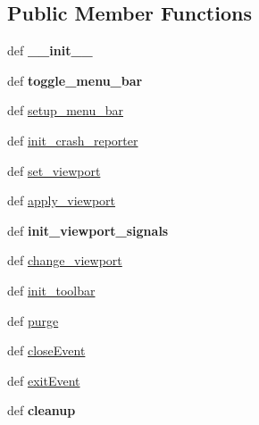 \subsection*{Public Member Functions}
\begin{DoxyCompactItemize}
\item 
\hypertarget{classcommotion__client_1_1GUI_1_1main__window_1_1MainWindow_a74b56753628f84bf3e19c128ef1fda19}{def {\bfseries \+\_\+\+\_\+init\+\_\+\+\_\+}}\label{classcommotion__client_1_1GUI_1_1main__window_1_1MainWindow_a74b56753628f84bf3e19c128ef1fda19}

\item 
\hypertarget{classcommotion__client_1_1GUI_1_1main__window_1_1MainWindow_a39b23e6f4f95af7d703ec03be942a7df}{def {\bfseries toggle\+\_\+menu\+\_\+bar}}\label{classcommotion__client_1_1GUI_1_1main__window_1_1MainWindow_a39b23e6f4f95af7d703ec03be942a7df}

\item 
def \hyperlink{classcommotion__client_1_1GUI_1_1main__window_1_1MainWindow_abacf45b62be7d880089c913e3f2f7f24}{setup\+\_\+menu\+\_\+bar}
\item 
def \hyperlink{classcommotion__client_1_1GUI_1_1main__window_1_1MainWindow_a2c803d1583ec7b548f5b2a9cb2014e4d}{init\+\_\+crash\+\_\+reporter}
\item 
def \hyperlink{classcommotion__client_1_1GUI_1_1main__window_1_1MainWindow_ad4d493c20e1d9898eeb41da87622ea49}{set\+\_\+viewport}
\item 
def \hyperlink{classcommotion__client_1_1GUI_1_1main__window_1_1MainWindow_a2972ac997218f50db2c18762ac48f23c}{apply\+\_\+viewport}
\item 
\hypertarget{classcommotion__client_1_1GUI_1_1main__window_1_1MainWindow_abf5e8a0add7f4fa1480c825a74e0e9b9}{def {\bfseries init\+\_\+viewport\+\_\+signals}}\label{classcommotion__client_1_1GUI_1_1main__window_1_1MainWindow_abf5e8a0add7f4fa1480c825a74e0e9b9}

\item 
def \hyperlink{classcommotion__client_1_1GUI_1_1main__window_1_1MainWindow_a0e9201cd1165369bdac93cf1b4658c6f}{change\+\_\+viewport}
\item 
def \hyperlink{classcommotion__client_1_1GUI_1_1main__window_1_1MainWindow_a08bdbda447c256d0cf5355d928ebb3fe}{init\+\_\+toolbar}
\item 
def \hyperlink{classcommotion__client_1_1GUI_1_1main__window_1_1MainWindow_a8e3325a8253a30ff8d900203d52a6e08}{purge}
\item 
def \hyperlink{classcommotion__client_1_1GUI_1_1main__window_1_1MainWindow_ac4b4245d881e0bd8417098bbf39e5353}{close\+Event}
\item 
def \hyperlink{classcommotion__client_1_1GUI_1_1main__window_1_1MainWindow_ab74365d561c1a4d58b9dc0932263f95e}{exit\+Event}
\item 
\hypertarget{classcommotion__client_1_1GUI_1_1main__window_1_1MainWindow_a73b785fffb64b1ce044326102b3727fe}{def {\bfseries cleanup}}\label{classcommotion__client_1_1GUI_1_1main__window_1_1MainWindow_a73b785fffb64b1ce044326102b3727fe}


\end{DoxyCompactItemize}
